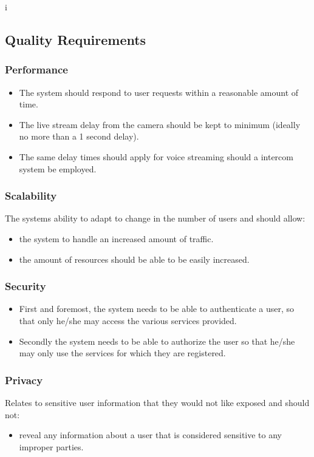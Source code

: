 i\documentclass[a4paper,12pt]{article}
\begin{document}
	\subsection{Quality Requirements}
	
	\subsubsection{Performance}
	\begin{itemize}
		\item The system should respond to user requests within a reasonable amount of time.
		\item The live stream delay from the camera should be kept to minimum (ideally no more than a 1 second delay). 
		\item The same delay times should apply for voice streaming should a intercom system be employed.
	\end{itemize}
	
	\subsubsection{Scalability}
	The systems ability to adapt to change in the number of users and should allow:
	\begin{itemize}
		\item the system to handle an increased amount of traffic.
		\item the amount of resources should be able to be easily increased. 
	\end{itemize}
	
	\subsubsection{Security}
	\begin{itemize}
		\item First and foremost, the system needs to be able to authenticate a user, so that only he/she may access the various services provided.
		\item Secondly the system needs to be able to authorize the user so that he/she may only use the services for which they are registered.
	\end{itemize}
	
	\subsubsection{Privacy}
	Relates to sensitive user information that they would not like exposed and should not:
	\begin{itemize}
		\item reveal any information about a user that is considered sensitive to any improper parties.
	\end{itemize}
	
\end{document}
